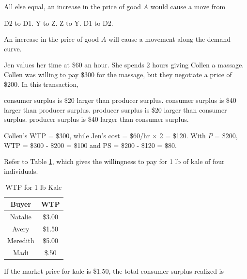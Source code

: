\documentclass[addpoints,11pt]{exam}
\theoremstyle{definition}
\begin{document}
\begin{questions}
		
		\question \label{blah8} All else equal, an increase in the price of good $A$ would cause a move from
		
		\begin{choices}
			\choice D2 to D1.
			\CorrectChoice Y to Z.
			\choice Z to Y.
			\choice D1 to D2.
		\end{choices}
		
		\begin{solution}
			An increase in the price of good $A$ will cause a movement along the demand curve.
		\end{solution}
		
	
	\question Jen values her time at \$60 an hour. She spends 2 hours giving Collen a massage. Collen was willing to pay \$300 for the massage, but they negotiate a price of \$200. In this transaction,
	
	\begin{choices}
		\CorrectChoice consumer surplus is \$20 larger than producer surplus.
		\choice consumer surplus is \$40 larger than producer surplus.
		\choice producer surplus is \$20 larger than consumer surplus.
		\choice producer surplus is \$40 larger than consumer surplus.
	\end{choices}
	
	\begin{solution}
		Collen's WTP = \$300, while Jen's cost = \$60/hr $\times$ 2 = \$120. With $P$ = \$200, WTP = \$300 - \$200 = \$100 and PS = \$200 - \$120 = \$80.
	\end{solution}

\newpage

	\question Refer to Table \ref{wtp}, which gives the willingness to pay for 1 lb of kale of four individuals.
	
	\begin{table}[H]
		\caption{WTP for 1 lb Kale}
		\label{wtp}
		\centering
		\begin{tabular}{  c| c    }    
			
			Buyer   & WTP \\
			\hline
			Natalie & \$3.00 \\
			Avery & \$1.50 \\
			Meredith & \$5.00 \\
			Madi & \$.50 \\
		\end{tabular}
		
	\end{table} 
	
	If the market price for kale is \$1.50, the total consumer surplus realized is
	

\end{questions}
\end{document}
